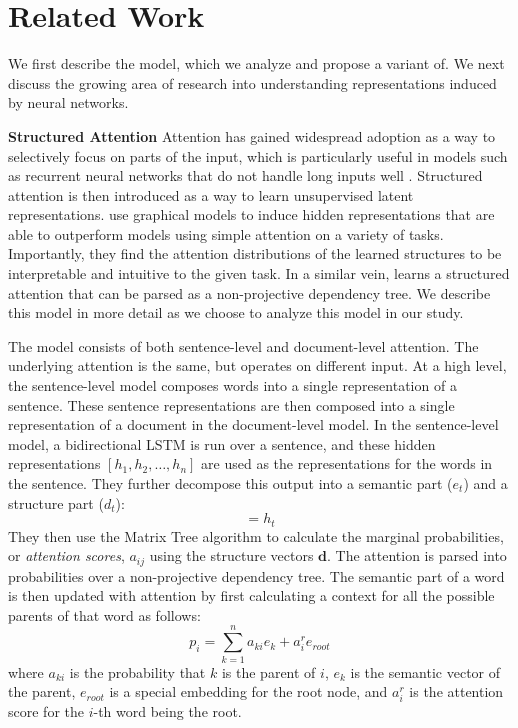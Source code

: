\section{Related Work}
We first describe the  model, which we analyze and propose a variant of. We next discuss the growing area of research into understanding representations induced by neural networks.

\smallskip
\noindent\textbf{Structured Attention}
Attention has gained widespread adoption as a way to selectively focus on parts of the input, which is particularly useful in models such as recurrent neural networks that do not handle long inputs well \cite{Luong:2015}. Structured attention is then introduced as a way to learn unsupervised latent representations.  use graphical models to induce hidden representations that are able to outperform models using simple attention on a variety of tasks. Importantly, they find the attention distributions of the learned structures to be interpretable and intuitive to the given task. In a similar vein,  learns a structured attention that can be parsed as a non-projective dependency tree. We describe this model in more detail as we choose to analyze this model in our study.

The  model consists of both sentence-level and document-level attention. The underlying attention is the same, but operates on different input. At a high level, the sentence-level model composes words into a single representation of a sentence. These sentence representations are then composed into a single representation of a document in the document-level model. In the sentence-level model, a bidirectional LSTM is run over a sentence, and these hidden representations $[h_1 , h_2 , \ldots, h_n]$ are used as the representations for the words in the sentence. They further decompose this output into a semantic part ($e_t$) and a structure part ($d_t$):
\begin{equation}
[e_t, d_t] = h_t
\end{equation}
They then use the Matrix Tree algorithm to calculate the marginal probabilities, or \emph{attention scores}, $a_{ij}$ using the structure vectors $\boldsymbol{d}$. The attention is parsed into probabilities over a non-projective dependency tree.  The semantic part of a word is then updated with attention by first calculating a context for all the possible parents of that word as follows:
\begin{equation}
\label{eq:parent}
p_i = \sum^{n}_{k=1}a_{ki}e_{k} + a^r_i e_{root}
\end{equation}
where $a_{ki}$ is the probability that $k$ is the parent of $i$, $e_k$ is the semantic vector of the parent, $e_{root}$ is a special embedding for the root node, and $a^r_i$ is the attention score for the $i$-th word being the root. 

